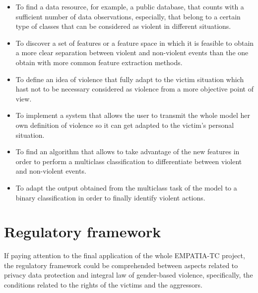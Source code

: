 	\begin{itemize}
		\item To find a data resource, for example, a public database, that counts with a sufficient number of data observations, especially, that belong to a certain type of classes that can be considered as violent in different situations.
		\item To discover a set of features or a feature space in which it is feasible to obtain a more clear separation between violent and non-violent events than the one obtain with more common feature extraction methods.
		\item To define an idea of violence that fully adapt to the victim situation which hast not to be necessary considered as violence from a more objective point of view.
		\item To implement a system that allows the user to transmit the whole model her own definition of violence so it can get adapted to the victim's personal situation.
		\item To find an algorithm that allows to take advantage of the new features in order to perform a multiclass classification to differentiate between violent and non-violent events.
		\item To adapt the output obtained from the multiclass task of the model to a binary classification in order to finally identify violent actions.
	\end{itemize}
		
\section{Regulatory framework}

	If paying attention to the final application of the whole EMPATIA-TC project, the regulatory framework could be comprehended between aspects related to privacy data protection and integral law of gender-based violence, specifically, the conditions related to the rights of the victims and the aggressors. 
	
